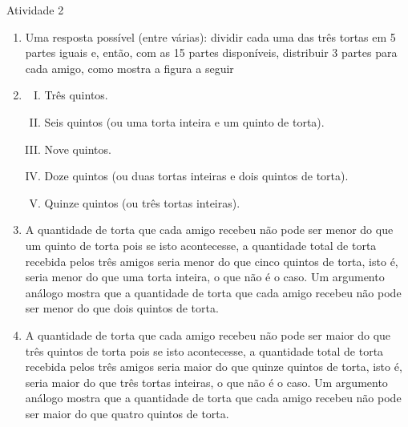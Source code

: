 \begin{multicols}{2}
\begin{resposta*}{Atividade 2}
\begin{enumerate} [\quad a)] %
    \item       Uma resposta possível (entre várias): dividir cada uma das três tortas em 5 partes iguais e, então, com as 15 partes disponíveis, distribuir 3 partes para cada amigo, como mostra a figura a seguir      
\begin{center}    
\end{center}
    \item
\begin{enumerate}[I)]
          \item Três quintos.
          \item Seis quintos (ou uma torta inteira e um quinto de torta).
          \item Nove quintos.
          \item Doze quintos (ou duas tortas inteiras e dois quintos de torta).
          \item Quinze quintos (ou três tortas inteiras).
\end{enumerate}

    \item       A quantidade de torta que cada amigo recebeu não pode ser menor do que um quinto de torta pois se isto acontecesse, a quantidade total de torta recebida pelos três amigos seria menor do que cinco quintos de torta, isto é, seria menor do que uma torta inteira, o que não é o caso. Um argumento análogo mostra que a quantidade de torta que cada amigo recebeu não pode ser menor do que dois quintos de torta.
    \item       A quantidade de torta que cada amigo recebeu não pode ser maior do que três quintos de torta pois se isto acontecesse, a quantidade total de torta recebida pelos três amigos seria maior do que quinze quintos de torta, isto é, seria maior do que três tortas inteiras, o que não é o caso. Um argumento análogo mostra que a quantidade de torta que cada amigo recebeu não pode ser maior do que quatro quintos de torta.
\end{enumerate} %



\end{resposta*}
\end{multicols}
